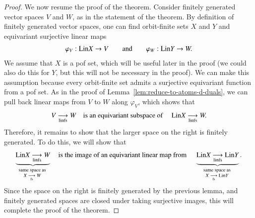 \begin{proof}
    
    We now resume the proof of the theorem. Consider finitely generated vector spaces $V$ and $W$, as in the statement of the theorem. 
    By definition of finitely generated vector spaces, one can find orbit-finite sets $X$ and $Y$ and equivariant surjective linear maps
    \begin{align*}
    \varphi_V : \mathrm{Lin} X \to V
    \qquad \text{and} \qquad
    \varphi_W : \mathrm{Lin} Y \to W.
    \end{align*}
    We assume  that $X$ is a pof set, which will be useful later in the proof (we could also do this for $Y$, but this will not be necessary in the proof). We can make this assumption because every orbit-finite set admits a surjective equivariant function from a pof set.
    As in the proof of Lemma~\ref{lem:reduce-to-atoms-d-duals}, we can pull back linear maps from $V$ to $W$ along $\varphi_V$, which shows that
        \begin{align*}
    V \underset{\text{linfs}}{\longrightarrow} W \quad \text{is an equivariant subspace of } \quad \mathrm{Lin} X \underset{\text{linfs}}{\longrightarrow} W.
    \end{align*}
    Therefore, it remains to show that the larger space on the right  is finitely generated. To do this, we will show that 
      \begin{align*}
\myunderbrace{    \linfsfun {\lincomb X} W}{same space as \\ 
$\fsfun X W$} \quad \text{is the image of an equivariant linear map from } \quad 
\myunderbrace{\linfsfun {\lincomb X} {\lincomb Y}}{same space as \\
$\fsfun X {\lincomb Y}$}.
    \end{align*}
    Since the space on the right is finitely generated by the previous lemma, and  finitely generated spaces are closed under taking surjective images, this will complete the proof of the theorem. 
    

\end{proof}
